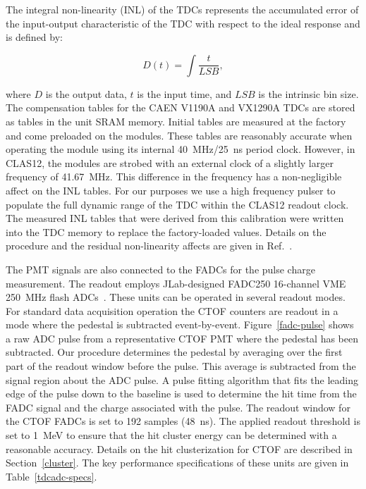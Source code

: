 \documentclass{elsart}
\begin{document}
The integral non-linearity (INL) of the TDCs represents the accumulated error of the input-output
characteristic of the TDC with respect to the ideal response and is defined by:

\begin{equation}
D(t) = \int \frac{t}{LSB},
\end{equation}

\noindent
where $D$ is the output data, $t$ is the input time, and $LSB$ is the intrinsic bin size. The compensation
tables for the CAEN V1190A and VX1290A TDCs are stored as tables in the unit SRAM memory. Initial
tables are measured at the factory and come preloaded on the modules. These tables are reasonably
accurate when operating the module using its internal 40~MHz/25~ns period clock. However, in CLAS12,
the modules are strobed with an external clock of a slightly larger frequency of 41.67~MHz. This difference
in the frequency has a non-negligible affect on the INL tables. For our purposes we use a high frequency
pulser to populate the full dynamic range of the TDC within the CLAS12 readout clock. The measured INL
tables that were derived from this calibration were written into the TDC memory to replace the factory-loaded
values. Details on the procedure and the residual non-linearity affects are given in Ref.~\cite{inl-tables}.

The PMT signals are also connected to the FADCs for the pulse charge measurement. The readout
employs JLab-designed FADC250 16-channel VME 250~MHz flash ADCs~\cite{fadc-manual}. These units
can be operated in several readout modes. For standard data acquisition operation the CTOF counters are
readout in a mode where the pedestal is subtracted event-by-event. Figure~\ref{fadc-pulse} shows a raw
ADC pulse from a representative CTOF PMT where the pedestal has been subtracted. Our procedure
determines the pedestal by averaging over the first part of the readout window before the pulse. This
average is subtracted from the signal region about the ADC pulse. A pulse fitting algorithm that fits the
leading edge of the pulse down to the baseline is used to determine the hit time from the FADC signal and
the charge associated with the pulse. The readout window for the CTOF FADCs is set to 192 samples
(48~ns). The applied readout threshold is set to 1~MeV to ensure that the hit cluster energy can be
determined with a reasonable accuracy. Details on the hit clusterization for CTOF are described in
Section~\ref{cluster}. The key performance specifications of these units are given in Table~\ref{tdcadc-specs}.
\end{document}
